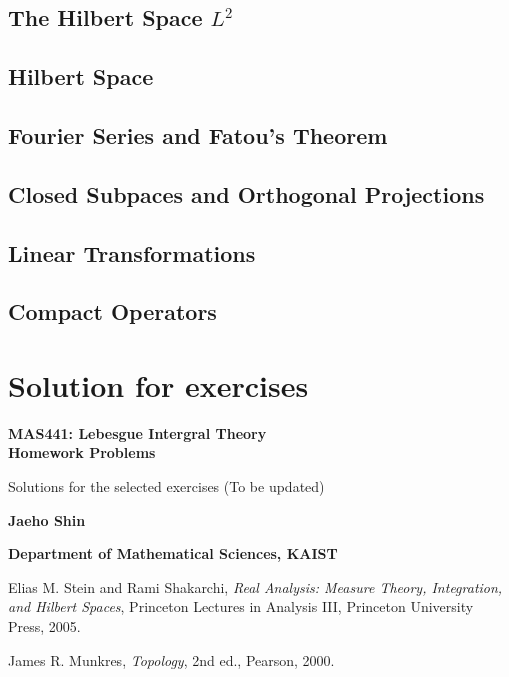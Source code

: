 \documentclass[12pt, a4paper, openany, twoside]{book}
\theoremstyle{definition}
\theoremstyle{remark}
\theoremstyle{plain}
\numberwithin{equation}{section}
\begin{document}
\section{The Hilbert Space $L^2$}
\section{Hilbert Space}
\section{Fourier Series and Fatou's Theorem}
\section{Closed Subpaces and Orthogonal Projections}
\section{Linear Transformations}
\section{Compact Operators}

\newpage
\chapter{Solution for exercises}
\begin{center}
    \vspace*{4cm}
        
    \Huge
    \textbf{MAS441: Lebesgue Intergral Theory\\\vspace{2mm}
    Homework Problems}

    \vspace{1cm}
    \large
    Solutions for the selected exercises (To be updated)
    \vspace{3cm}
    
    \LARGE
    \textbf{Jaeho Shin}
        
    \vspace{5cm}
        
    \normalsize
    \textbf{Department of Mathematical Sciences, KAIST}\\  
\end{center}

\newpage

\begin{thebibliography}{99}

Elias M. Stein and Rami Shakarchi,
\textit{Real Analysis: Measure Theory, Integration, and Hilbert Spaces},
Princeton Lectures in Analysis III, Princeton University Press, 2005.

James R. Munkres,  
\textit{Topology},  
2nd ed., Pearson, 2000.

\end{thebibliography}
\end{document}

